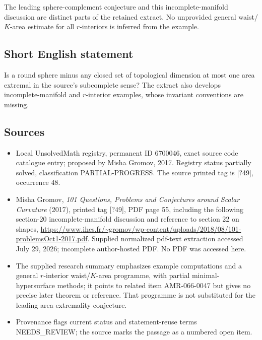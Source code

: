 \documentclass[11pt]{article}
\begin{document}
The leading sphere-complement conjecture and this incomplete-manifold discussion are distinct parts of the retained extract. No unprovided general waist/$K$-area estimate for all $r$-interiors is inferred from the example.
\subsection{Short English statement}
Is a round sphere minus any closed set of topological dimension at most one area extremal in the source's subcomplete sense? The extract also develops incomplete-manifold and $r$-interior examples, whose invariant conventions are missing.
\subsection{Sources}
\begin{itemize}
\item Local UnsolvedMath registry, permanent ID 6700046, exact source code catalogue entry; proposed by Misha Gromov, 2017. Registry status partially solved, classification PARTIAL-PROGRESS. The source printed tag is [?49], occurrence 48.
\item Misha Gromov, \emph{101 Questions, Problems and Conjectures around Scalar Curvature} (2017), printed tag [?49], PDF page 55, including the following section-20 incomplete-manifold discussion and reference to section 22 on shapes, \url{https://www.ihes.fr/~gromov/wp-content/uploads/2018/08/101-problemsOct1-2017.pdf}. Supplied normalized pdf-text extraction accessed July 29, 2026; incomplete author-hosted PDF. No PDF was accessed here.
\item The supplied research summary emphasizes example computations and a general $r$-interior waist/$K$-area programme, with partial minimal-hypersurface methods; it points to related item AMR-066-0047 but gives no precise later theorem or reference. That programme is not substituted for the leading area-extremality conjecture.
\item Provenance flags current status and statement-reuse terms NEEDS\_REVIEW; the source marks the passage as a numbered open item.
\end{itemize}
\end{document}
